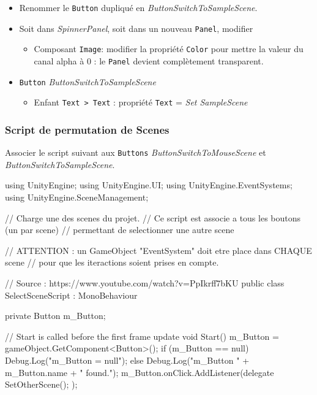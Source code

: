 \documentclass[a4paper,10pt]{article}
\newenvironment{solution}%
{\begin{tcolorbox}[breakable,colback=red!5!white,colframe=red!75!black,title=Solution]}%
{\end{tcolorbox}}
\newenvironment{boxcode}%
{\begin{tcolorbox}[breakable,colback=gray!5!white,colframe=black]}%
	{\end{tcolorbox}}
\begin{document}
\begin{solution}
\begin{itemize}
\begin{itemize}
		\item Renommer le \texttt{Button} dupliqué en  \textit{ButtonSwitchToSampleScene}.
	
		\item Soit dans \textit{SpinnerPanel}, soit dans un nouveau \texttt{Panel}, modifier
	\begin{itemize}
		\item 	Composant \texttt{Image}: modifier la propriété \texttt{Color} pour mettre la valeur du canal alpha à 0 : le \texttt{Panel} devient complètement transparent.
	\end{itemize}	
	\item \texttt{Button} \textit{ButtonSwitchToSampleScene}
	\begin{itemize}
		\item Enfant \texttt{Text > Text} : propriété \texttt{Text} = \textit{Set SampleScene}
	\end{itemize}
\end{itemize}	
\end{itemize}

\subsubsection{Script de permutation de Scenes}

Associer le script suivant aux \texttt{Buttons}  \textit{ButtonSwitchToMouseScene} et \textit{ButtonSwitchToSampleScene}.


\begin{boxcode}
\begin{csharpsansbord}
using UnityEngine;
using UnityEngine.UI;
using UnityEngine.EventSystems;
using UnityEngine.SceneManagement;

// Charge une des scenes du projet.
// Ce script est associe a tous les boutons (un par scene)
// permettant de selectionner une autre scene

// ATTENTION : un GameObject "EventSystem" doit etre place dans CHAQUE scene
// pour que les iteractions soient prises en compte.

// Source : https://www.youtube.com/watch?v=PpIkrff7bKU
public class SelectSceneScript : MonoBehaviour
{
	private Button m_Button;
	
	// Start is called before the first frame update
	void Start()
	{
		m_Button = gameObject.GetComponent<Button>();
		if (m_Button == null) {
			Debug.Log("m_Button = null");
		}
		else {
			Debug.Log("m_Button " + m_Button.name + " found.");
		}
		m_Button.onClick.AddListener(delegate {
			SetOtherScene();
		});
	}
	
}
\end{csharpsansbord}
\end{boxcode}
\end{solution}
\end{document}
